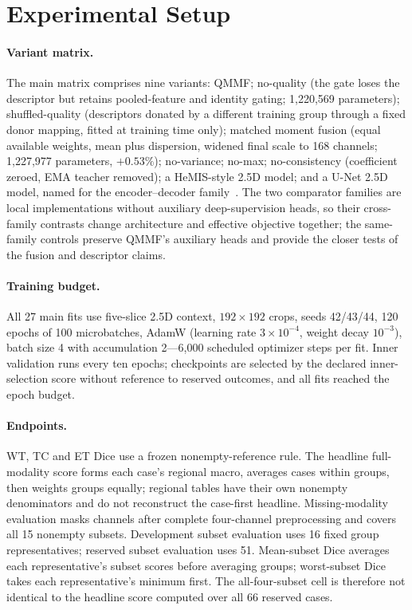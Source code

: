 \section{Experimental Setup}
\label{sec:setup}

\paragraph{Variant matrix.}
The main matrix comprises nine variants: QMMF; no-quality (the gate loses the descriptor but retains pooled-feature and identity gating; 1{,}220{,}569 parameters); shuffled-quality (descriptors donated by a different training group through a fixed donor mapping, fitted at training time only); matched moment fusion (equal available weights, mean plus dispersion, widened final scale to 168 channels; 1{,}227{,}977 parameters, $+0.53\%$); no-variance; no-max; no-consistency (coefficient zeroed, EMA teacher removed); a HeMIS-style 2.5D model; and a U-Net 2.5D model, named for the encoder--decoder family~\cite{ronneberger2015unet}. The two comparator families are local implementations without auxiliary deep-supervision heads, so their cross-family contrasts change architecture and effective objective together; the same-family controls preserve QMMF's auxiliary heads and provide the closer tests of the fusion and descriptor claims.

\paragraph{Training budget.}
All 27 main fits use five-slice 2.5D context, $192{\times}192$ crops, seeds 42/43/44, 120 epochs of 100 microbatches, AdamW (learning rate $3{\times}10^{-4}$, weight decay $10^{-3}$), batch size 4 with accumulation 2---6{,}000 scheduled optimizer steps per fit. Inner validation runs every ten epochs; checkpoints are selected by the declared inner-selection score without reference to reserved outcomes, and all fits reached the epoch budget.

\paragraph{Endpoints.}
WT, TC and ET Dice use a frozen nonempty-reference rule. The headline full-modality score forms each case's regional macro, averages cases within groups, then weights groups equally; regional tables have their own nonempty denominators and do not reconstruct the case-first headline. Missing-modality evaluation masks channels after complete four-channel preprocessing and covers all 15 nonempty subsets. Development subset evaluation uses 16 fixed group representatives; reserved subset evaluation uses 51. Mean-subset Dice averages each representative's subset scores before averaging groups; worst-subset Dice takes each representative's minimum first. The all-four-subset cell is therefore not identical to the headline score computed over all 66 reserved cases.

